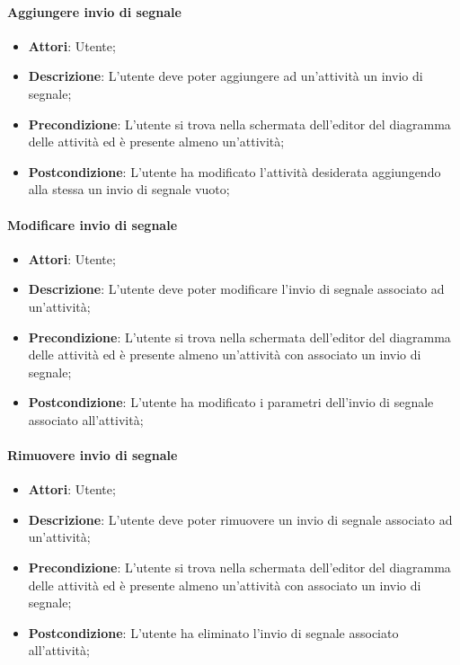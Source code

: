 \paragraph{Aggiungere invio di segnale}
\begin{itemize}
	\item \textbf{Attori}: Utente;
	\item \textbf{Descrizione}: L'utente deve poter aggiungere ad un'attività un invio di segnale;
	\item \textbf{Precondizione}: L'utente si trova nella schermata dell'editor del diagramma delle attività ed è presente almeno un'attività;
	\item \textbf{Postcondizione}: L'utente ha modificato l'attività desiderata aggiungendo alla stessa un invio di segnale vuoto;
\end{itemize}

\paragraph{Modificare invio di segnale}
\begin{itemize}
	\item \textbf{Attori}: Utente;
	\item \textbf{Descrizione}: L'utente deve poter modificare l'invio di segnale associato ad un'attività;
	\item \textbf{Precondizione}: L'utente si trova nella schermata dell'editor del diagramma delle attività ed è presente almeno un'attività con associato un invio di segnale;
	\item \textbf{Postcondizione}: L'utente ha modificato i parametri dell'invio di segnale associato all'attività;
\end{itemize}

\paragraph{Rimuovere invio di segnale}
\begin{itemize}
	\item \textbf{Attori}: Utente;
	\item \textbf{Descrizione}: L'utente deve poter rimuovere un invio di segnale associato ad un'attività;
	\item \textbf{Precondizione}: L'utente si trova nella schermata dell'editor del diagramma delle attività ed è presente almeno un'attività con associato un invio di segnale;
	\item \textbf{Postcondizione}: L'utente ha eliminato l'invio di segnale associato all'attività;
\end{itemize}

